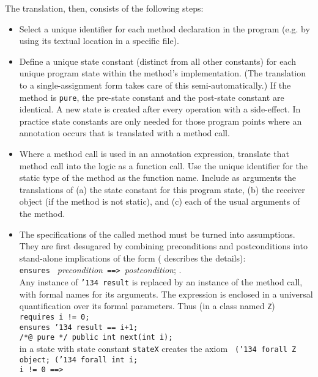 \documentclass{sig-alternate}
\begin{document}
The translation, then, consists of the following steps:
\setlength{\partopsep}{0in}\setlength{\parskip}{0in}\setlength{\itemsep}{0in}\setlength{\topsep}{0in}
\begin{itemize}
\setlength{\partopsep}{0in}\setlength{\parskip}{0in}\setlength{\itemsep}{0in}\setlength{\topsep}{0in}
\item Select a unique identifier for each method declaration in the program (e.g. by using its
textual location in a specific file).
\item Define a unique state constant (distinct from all other constants) for each unique program
state within the method's implementation.  (The translation to a single-assignment form
takes care of this semi-automatically.)
If the method is \texttt{pure}, the pre-state constant and the post-state
constant are identical.  A new state is created after every operation with a side-effect.  
In
practice state constants are only needed for those program points where an annotation occurs
that is translated with
a method call.
\item Where a method call is used in an annotation expression, translate that method call
into the logic as a function call.  Use the unique identifier for the static
type of the method as the function name.  Include as arguments the translations of (a) the
state constant for this  program state, (b) the receiver object (if the method is not static),
and (c) each of the usual arguments of the method.
\item The specifications of the called method must be turned into assumptions.  They 
are first desugared by combining preconditions and postconditions
into stand-alone implications of the form (\cite{Raghavan-Leavens03} describes the details): \\
{\centering \texttt{ensures } {\em precondition}\texttt{ ==> }{\em postcondition}; }.\\
Any instance of \texttt{\char'134 result} is replaced by an instance of the method call, with
formal names for its arguments.  The expression is enclosed in a universal quantification over
its formal parameters.  Thus (in a class named \texttt{Z})\\
\texttt{requires i != 0;}\\
\texttt{ensures \char'134 result == i+1; }\\
\texttt{/*@ pure */ public int next(int i);}\\
in a state with state constant \texttt{stateX} creates the axiom 
\texttt{ (\char'134 forall Z object; (\char'134 forall int i;  \\ i != 0 ==> 
}
\end{itemize}
\end{document}
